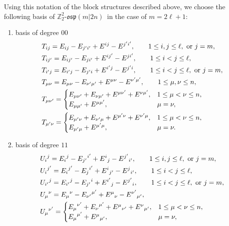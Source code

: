\documentclass[10pt,a4paper]{amsart}
\numberwithin{equation}{section}
\theoremstyle{definition}
\def\Z2{\mathbb{Z}_2^2}
\def\osp{\mathfrak{osp}}
\def\Zosp{$\Z2$-$\osp(m|2n)$}
\begin{document}
Using this notation of the block structures described above, we choose the following basis of \Zosp\ in the case of $ m= 2\ell + 1$:
\begin{enumerate}\itemsep=0pt
\item[(i)] basis of degree $00$
\begin{align*}
	&T_{ij}=E_{ij}-E_{j'i'}+E^{ij}-E^{j'i'}, \qquad 1 \leq i, j \leq \ell, \text{ or } j=m,
	\notag\\
	&T_{ij'}=E_{ij'}-E_{ji'}+E^{ij'}-E^{ji'},\qquad 1 \leq i< j \leq \ell,
	\notag\\
	&T_{i'j}=E_{i'j}-E_{j'i}+E^{i'j}-E^{j'i},\qquad 1 \leq i< j \leq \ell, \text{ or } j=m,
	\notag\\
	&T_{\mu\nu}=E_{\mu\nu}-E_{\nu'\mu'}+E^{\mu\nu}-E^{\nu'\mu'}, \qquad 1 \leq \mu, \nu \leq n,
	\notag\\
	&T_{\mu\nu'}=
	\begin{cases}
		E_{\mu\nu'}+E_{\nu\mu'}+E^{\mu\nu'}+E^{\nu\mu'},& 1 \leq \mu<\nu \leq n,\\
		E_{\mu\mu'}+E^{\mu\mu'},&\mu=\nu,
	\end{cases}
	\notag\\
	&T_{\mu'\nu}=
	\begin{cases}
		E_{\mu'\nu}+E_{\nu'\mu}+E^{\mu'\nu}+E^{\nu'\mu},& 1 \leq \mu<\nu \leq n,\\
		E_{\mu'\mu}+E^{\mu'\mu}, & \mu=\nu.
	\end{cases}
\end{align*}
\item[(ii)] basis of degree $11$
\begin{align*}
	&{U_{i}}^{j}={E_{i}}^{j}-{E_{j'}}^{i'}+{E^{i}}_{j}-{E^{j'}}_{i'}, \qquad 1 \leq i, j \leq \ell, \text{ or } j=m,
	\notag\\
	&{U_{i}}^{j'}={E_{i}}^{j'}-{E_{j}}^{i'}+{E^{i}}_{j'}-{E^{j}}_{i'},\qquad 1 \leq i< j \leq \ell,
	\notag\\
	&{U_{i'}}^{j}={E_{i'}}^{j}-{E_{j'}}^{i}+{E^{i'}}_{j}-{E^{j'}}_{i},\qquad 1 \leq i< j \leq \ell, \text{ or } j=m,
	\notag\\
	&{U_{\mu}}^{\nu}={E_{\mu}}^{\nu}-{E_{\nu'}}^{\mu'}+{E^{\mu}}_{\nu}-{E^{\nu'}}_{\mu'},
	\notag\\
	&{U_{\mu}}^{\nu'}=
	\begin{cases}
		{E_{\mu}}^{\nu'}+{E_{\nu}}^{\mu'}+{E^{\mu}}_{\nu'}+{E^{\nu}}_{\mu'},& 1 \leq \mu<\nu \leq n,\\
		{E_{\mu}}^{\mu'}+{E^{\mu}}_{\mu'},& \mu=\nu,
	\end{cases}
	\notag\\

\end{align*}
\end{enumerate}
\end{document}
